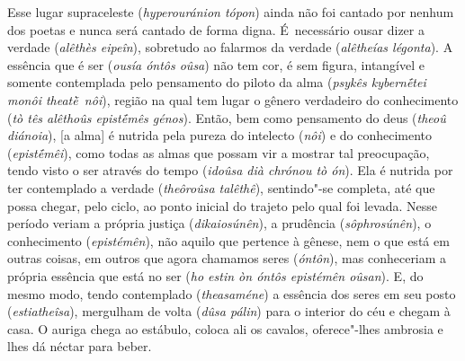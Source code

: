 Esse lugar supraceleste (\emph{hyperouránion tópon}) ainda não foi
cantado por nenhum dos poetas e nunca será cantado de forma digna. É~necessário ousar dizer a verdade (\emph{alêthès eipeîn}), sobretudo ao
falarmos da verdade (\emph{alêtheías
légonta}). A essência que é ser (\emph{ousía óntôs oûsa})
não tem cor, é sem figura, intangível e somente contemplada pelo
pensamento do piloto da alma (\emph{psykês kybernḗtei monôi
theatḕ~nôi}), região na qual tem lugar o gênero verdadeiro do
conhecimento (\emph{tò tês alêthoûs epistḗmês génos}). \bekker{[247d]} Então,
bem como pensamento do deus (\emph{theoû diánoia}), [a alma] é
nutrida pela pureza do intelecto (\emph{nôi}) e do conhecimento
(\emph{epistḗmêi}), como todas as almas que possam vir a mostrar tal
preocupação, tendo visto o ser através do tempo (\emph{idoûsa dià
chrónou tò ón}). Ela é nutrida por ter contemplado a verdade
(\emph{theôroûsa talêthê}), sentindo"-se completa, até que possa chegar,
pelo ciclo, ao ponto inicial do trajeto pelo qual foi levada. Nesse
período veriam a própria justiça (\emph{dikaiosúnên}), a prudência
(\emph{sôphrosúnên}), o conhecimento (\emph{epistémên}), \bekker{[247e]} não
aquilo que pertence à gênese, nem o que está em outras coisas, em outros
que agora chamamos seres (\emph{óntôn}), mas conheceriam a própria
essência que está no ser (\emph{ho estin òn óntôs epistémên oûsan}). E,
do mesmo modo, tendo contemplado (\emph{theasaméne}) a essência dos
seres em seu posto (\emph{estiatheîsa}), mergulham de volta (\emph{dûsa
pálin}) para o interior do céu e chegam à casa. O
auriga chega ao estábulo, coloca ali os cavalos, oferece"-lhes ambrosia e
lhes dá néctar para beber.


